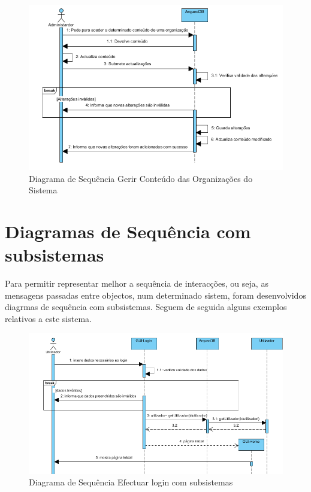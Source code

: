 \documentclass[12pt,a4paper]{article}
\begin{document}
\begin{figure}[h!]
\centering
\includegraphics[scale=1]{sequencia/gerirconteudo}
\caption{Diagrama de Sequência Gerir Conteúdo das Organizações do Sistema} 
\end{figure}  

\clearpage
\section{Diagramas de Sequência com subsistemas}
Para permitir representar melhor a sequência de interacções, ou
seja, as mensagens passadas entre objectos, num determinado sistem, foram desenvolvidos diagrmas de sequência com subsistemas. Seguem de seguida alguns exemplos relativos a este sistema.\\

\begin{figure}[h!]
\centering
\includegraphics[scale=0.7]{sequencia/est_login}
\caption{Diagrama de Sequência Efectuar login com subsistemas} 
\end{figure}  
\end{document}
